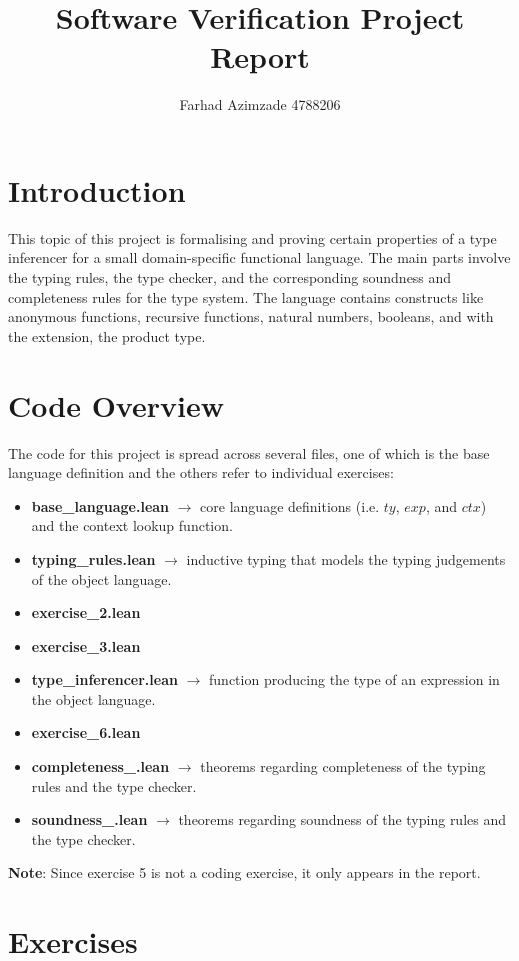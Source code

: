 \documentclass{article}
\title{Software Verification Project Report}
\author{Farhad Azimzade 4788206}
\date{}
\begin{document}
\maketitle

\section{Introduction}
This topic of this project is formalising and proving certain properties of a type inferencer for a small domain-specific functional language. The main parts involve the typing rules, the type checker, and the corresponding soundness and completeness rules for the type system. The language contains constructs like anonymous functions, recursive functions, natural numbers, booleans, and with the extension, the product type.


\section{Code Overview}
The code for this project is spread across several files, one of which is the base language definition and the others refer to individual exercises:
\begin{itemize}
\item \textbf{base\_language.lean} $\to$ core language definitions (i.e. $ty$, $exp$, and $ctx$) and the context lookup function.
\item \textbf{typing\_rules.lean} $\to$ inductive typing that models the typing judgements of the object language.
\item \textbf{exercise\_2.lean}
\item \textbf{exercise\_3.lean}
\item \textbf{type\_inferencer.lean} $\to$ function producing the type of an expression in the object language.
\item \textbf{exercise\_6.lean}
\item \textbf{completeness\_.lean} $\to$ theorems regarding completeness of the typing rules and the type checker.
\item \textbf{soundness\_.lean} $\to$ theorems regarding soundness of the typing rules and the type checker.
\end{itemize}

\textbf{Note}: Since exercise 5 is not a coding exercise, it only appears in the report.

\section{Exercises}
\end{document}
